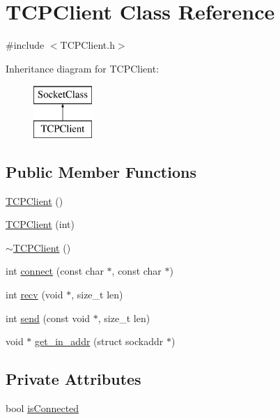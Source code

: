 \hypertarget{classTCPClient}{\section{\-T\-C\-P\-Client \-Class \-Reference}
\label{classTCPClient}
}


{\ttfamily \#include $<$\-T\-C\-P\-Client.\-h$>$}

\-Inheritance diagram for \-T\-C\-P\-Client\-:\begin{figure}[H]
\begin{center}
\leavevmode
\includegraphics[height=2.000000cm]{classTCPClient}
\end{center}
\end{figure}
\subsection*{\-Public \-Member \-Functions}
\begin{DoxyCompactItemize}
\item 
\hyperlink{classTCPClient_ad37bba4f2ebcc899b9871656802dcbe9}{\-T\-C\-P\-Client} ()
\item 
\hyperlink{classTCPClient_aa348b6919298978537c7921ee185ffd6}{\-T\-C\-P\-Client} (int)
\item 
\hyperlink{classTCPClient_a869a5b3319ca562d03cb4c59ebec4407}{$\sim$\-T\-C\-P\-Client} ()
\item 
int \hyperlink{classTCPClient_a1629ed9ba8cd5a29daefc530cad68ebf}{connect} (const char $\ast$, const char $\ast$)
\item 
int \hyperlink{classTCPClient_abbccd38e761fb550749504dbe26c8cdf}{recv} (void $\ast$, size\-\_\-t len)
\item 
int \hyperlink{classTCPClient_ab89b479cb995571d860587e43333730c}{send} (const void $\ast$, size\-\_\-t len)
\item 
void $\ast$ \hyperlink{classTCPClient_a63fdb0cbcc66300ffe84445b30c626f1}{get\-\_\-in\-\_\-addr} (struct sockaddr $\ast$)
\end{DoxyCompactItemize}
\subsection*{\-Private \-Attributes}
\begin{DoxyCompactItemize}
\item 
bool \hyperlink{classTCPClient_a1d653a3fc1b8c2235eac2997d35bbf53}{is\-Connected}
\end{DoxyCompactItemize}


